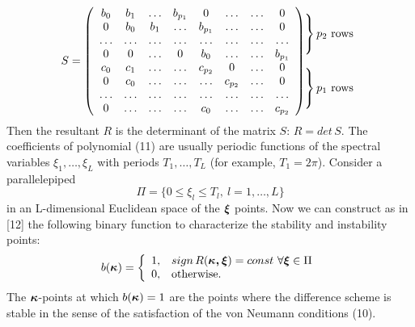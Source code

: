 \begin{eqnarray}
 S =
\left( \begin{array}{cccccccc}
b_{0} & b_{1} & \ldots & b_{p_{1}} & 0 & \ldots & \ldots & 0 \\
0 & b_{0} & b_{1} & \ldots & b_{p_{1}} & \ldots & \ldots & 0 \\
\ldots & \ldots & \ldots & \ldots & \ldots & \ldots & \ldots &\ldots \\
0 & 0 & \ldots & 0 & b_{0} & \ldots & \ldots & b_{p_{1}} \\
c_{0} & c_{1} & \ldots & \ldots & c_{p_{2}} & 0 & \ldots & 0 \\
0 & c_{0} & \ldots & \ldots & \ldots & c_{p_{2}} & \ldots & 0 \\
\ldots & \ldots & \ldots & \ldots & \ldots &\ldots & \ldots & \ldots \\
0 & \ldots & \ldots & \ldots & c_{0} & \ldots & \ldots & c_{p_{2}}
\end{array} \right)
\!\!\!\!\!\!\!\!\!\!\!\begin{array}{c}
\left. \begin{array}[b]{c}
 \\ \\  \end{array} \right \} \mbox{$p_2$ rows}
\\~\\ \left.
\begin{array}[t]{c}
  \\  \\  \end{array} \right \} \mbox{$p_1$ rows} \end{array}
\end{eqnarray}
Then the resultant $R$ is the determinant of the matrix $S$: $R=det\,S$.
The coefficients of polynomial (11) are usually periodic functions of the
spectral variables $\xi_1,\ldots,\xi_L$ with periods $T_1,\ldots,T_L$ (for
example, $T_1=2\pi$). Consider a parallelepiped
\begin{equation}
\Pi=\{0\leq\xi_l\leq T_l,~l=1,\ldots,L\}
\end{equation}
in an L-dimensional Euclidean space of the $\mbox{\boldmath
$\xi$\unboldmath}$ points. Now we can construct as in [12] the following
binary function to characterize the stability and instability points:
\begin{eqnarray}
b(\mbox{\boldmath$\kappa$\unboldmath})=\left \{ \begin{array}{ll}
1,&sign\,R(\mbox{\boldmath$\kappa,\xi$\unboldmath})=const ~\forall
\mbox{\boldmath$\xi$\unboldmath}\in \Pi\\
0,&\mbox{otherwise}.
\end{array} \right.
\end{eqnarray}
The $\mbox{\boldmath$\kappa$\unboldmath}$-points at which
$b(\mbox{\boldmath$\kappa$\unboldmath})=1$ are the points where the difference
scheme is stable in the sense of the satisfaction of the von Neumann
conditions (10).

